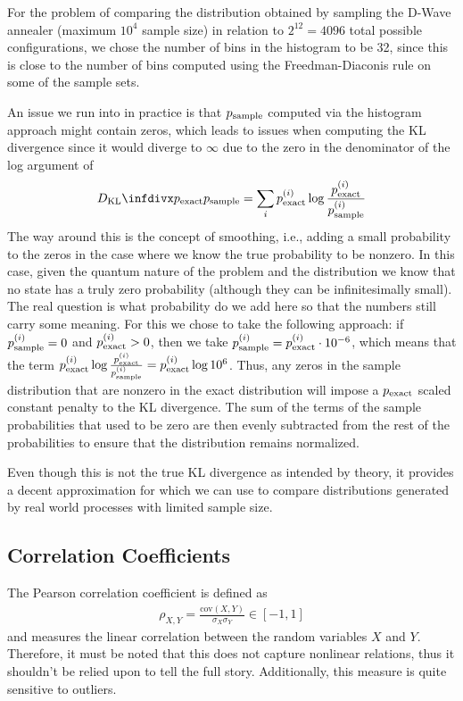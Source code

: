 For the problem of comparing the distribution obtained by sampling the D-Wave annealer (maximum \( 10^4 \) sample size) in relation to \( 2^{12} = 4096 \) total possible configurations, we chose the number of bins in the histogram to be 32, since this is close to the number of bins computed using the Freedman-Diaconis rule on some of the sample sets.

An issue we run into in practice is that \( p_{\text{sample}} \) computed via the histogram approach might contain zeros, which leads to issues when computing the KL divergence since it would diverge to \( \infty \) due to the zero in the denominator of the log argument of
\begin{align}
    \DKL{\pexact}{\psample} = \sum_i \pexact^{(i)} \log\frac{\pexact^{(i)}}{\psample^{(i)}}
\end{align}
The way around this is the concept of smoothing, i.e., adding a small probability to the zeros in the case where we know the true probability to be nonzero.
In this case, given the quantum nature of the problem and the distribution we know that no state has a truly zero probability (although they can be infinitesimally small).
The real question is what probability do we add here so that the numbers still carry some meaning.
For this we chose to take the following approach: if \( p_{\text{sample}}^{(i)} = 0 \) and \( p_{\text{exact}}^{(i)} > 0 \), then we take \( p_{\text{sample}}^{(i)} = p_{\text{exact}}^{(i)} \cdot 10^{-6} \), which means that the term \( p_{\text{exact}}^{(i)} \log \frac{p_{\text{exact}}^{(i)}}{p_{\text{sample}}^{(i)}} = p_{\text{exact}}^{(i)} \log 10^6 \).
Thus, any zeros in the sample distribution that are nonzero in the exact distribution will impose a \( p_{\text{exact}} \) scaled constant penalty to the KL divergence.
The sum of the terms of the sample probabilities that used to be zero are then evenly subtracted from the rest of the probabilities to ensure that the distribution remains normalized.

Even though this is not the true KL divergence as intended by theory, it provides a decent approximation for which we can use to compare distributions generated by real world processes with limited sample size.


\subsection{Correlation Coefficients}\label{app:correlation_coefficients}
The Pearson correlation coefficient is defined as
\begin{align}
    \rho_{X,Y} = \frac{\text{cov}{(X,Y)}}{\sigma_X \sigma_Y} \in [-1, 1]
\end{align}
and measures the linear correlation between the random variables \( X \) and \( Y \).
Therefore, it must be noted that this does not capture nonlinear relations, thus it shouldn't be relied upon to tell the full story.
Additionally, this measure is quite sensitive to outliers.

